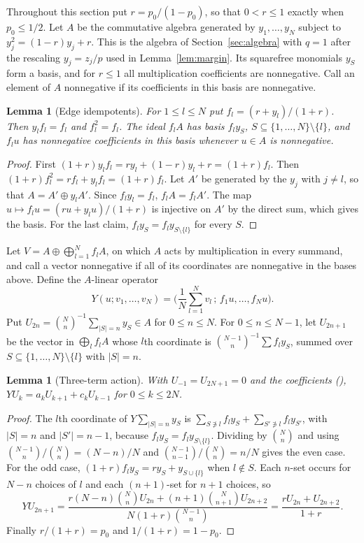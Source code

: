 \documentclass[twoside,10pt]{article}
\numberwithin{equation}{section}
\theoremstyle{slbody}
\newtheorem{lemma}[theorem]{Lemma}
\theoremstyle{definition}
\theoremstyle{remark}
\renewcommand{\eqref}[1]{\textup{{\normalfont(\oldstylenums{\ref{#1}}}\normalfont)}}
\begin{document}
Throughout this section put $r=p_0/(1-p_0)$, so that $0<r\leq1$ exactly when $p_0\leq1/2$. Let $A$ be the commutative algebra generated by $y_1,\ldots,y_N$ subject to $y_j^2=(1-r)y_j+r$. This is the algebra of Section~\ref{sec:algebra} with $q=1$ after the rescaling $y_j=z_j/p$ used in Lemma~\ref{lem:margin}. Its squarefree monomials $y_S$ form a basis, and for $r\leq1$ all multiplication coefficients are nonnegative. Call an element of $A$ nonnegative if its coefficients in this basis are nonnegative.

\begin{lemma}[Edge idempotents]\label{lem:edge}
For $1\leq l\leq N$ put $f_l=(r+y_l)/(1+r)$. Then $y_lf_l=f_l$ and $f_l^2=f_l$. The ideal $f_lA$ has basis $f_ly_S$, $S\subseteq\{1,\ldots,N\}\setminus\{l\}$, and $f_l u$ has nonnegative coefficients in this basis whenever $u\in A$ is nonnegative.
\end{lemma}
\begin{proof}
First $(1+r)y_lf_l=ry_l+(1-r)y_l+r=(1+r)f_l$. Then $(1+r)f_l^2=rf_l+y_lf_l=(1+r)f_l$. Let $A'$ be generated by the $y_j$ with $j\neq l$, so that $A=A'\oplus y_lA'$. Since $f_ly_l=f_l$, $f_lA=f_lA'$. The map $u\mapsto f_lu=(ru+y_lu)/(1+r)$ is injective on $A'$ by the direct sum, which gives the basis. For the last claim, $f_ly_S=f_ly_{S\setminus\{l\}}$ for every $S$.
\end{proof}

Let $V=A\oplus\bigoplus_{l=1}^Nf_lA$, on which $A$ acts by multiplication in every summand, and call a vector nonnegative if all of its coordinates are nonnegative in the bases above. Define the $A$-linear operator
\[
Y(u;v_1,\ldots,v_N)=\Big(\frac1N\sum_{l=1}^Nv_l\,;\,f_1u,\ldots,f_Nu\Big).
\]
Put $U_{2n}=\binom Nn^{-1}\sum_{|S|=n}y_S\in A$ for $0\leq n\leq N$. For $0\leq n\leq N-1$, let $U_{2n+1}$ be the vector in $\bigoplus_lf_lA$ whose $l$th coordinate is $\binom{N-1}n^{-1}\sum f_ly_S$, summed over $S\subseteq\{1,\ldots,N\}\setminus\{l\}$ with $|S|=n$.

\begin{lemma}[Three-term action]\label{lem:qthree}
With $U_{-1}=U_{2N+1}=0$ and the coefficients \eqref{eq:qarray}, $YU_k=a_kU_{k+1}+c_kU_{k-1}$ for $0\leq k\leq2N$.
\end{lemma}
\begin{proof}
The $l$th coordinate of $Y\sum_{|S|=n}y_S$ is $\sum_{S\not\ni l}f_ly_S+\sum_{S'\not\ni l}f_ly_{S'}$, with $|S|=n$ and $|S'|=n-1$, because $f_ly_S=f_ly_{S\setminus\{l\}}$. Dividing by $\binom Nn$ and using $\binom{N-1}n/\binom Nn=(N-n)/N$ and $\binom{N-1}{n-1}/\binom Nn=n/N$ gives the even case. For the odd case, $(1+r)f_ly_S=ry_S+y_{S\cup\{l\}}$ when $l\notin S$. Each $n$-set occurs for $N-n$ choices of $l$ and each $(n+1)$-set for $n+1$ choices, so
\[
YU_{2n+1}=\frac{r(N-n)\binom Nn U_{2n}+(n+1)\binom N{n+1}U_{2n+2}}{N(1+r)\binom{N-1}n}
=\frac{rU_{2n}+U_{2n+2}}{1+r}.
\]
Finally $r/(1+r)=p_0$ and $1/(1+r)=1-p_0$.
\end{proof}
\end{document}

